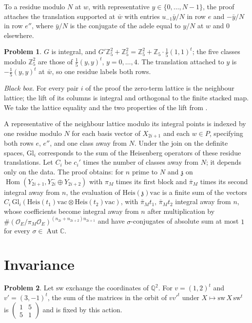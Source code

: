 \documentclass[reqno]{amsart}
\theoremstyle{definition}
\newtheorem{problem}{Problem}[section]
\theoremstyle{plain}
\newcommand{\Z}{\mathbb{Z}}
\newcommand{\Q}{\mathbb{Q}}
\newcommand{\C}{\mathbb{C}}
\newcommand{\Oc}{\mathcal{O}}
\newcommand{\Hom}{\operatorname{Hom}}
\newcommand{\Aut}{\operatorname{Aut}}
\newcommand{\Heis}{\mathrm{Heis}}
\newcommand{\vac}{\mathrm{vac}}
\newcommand{\Gl}{\mathrm{Gl}}
\newcommand{\z}{{\mathfrak{z}}}
\begin{document}
To a residue modulo \(N\) at \(w\), with representative \(y\in\{0,\dots,N-1\}\), the proof attaches the translation supported at \(\bar w\) with entries \(u_{-1}\bar y/N\) in row \(e\) and \(-\bar y/N\) in row \(e''\), where \(\bar y/N\) is the conjugate of the adele equal to \(y/N\) at \(w\) and \(0\) elsewhere.

\begin{problem}\label{pr:one-residue}
\(G\) is integral, and \(G'\Z_5^2+\Z_5^2=\Z_5^2+\Z_5\cdot\tfrac15(1,1)^t\); the five classes modulo \(\Z_5^2\) are those of \(\tfrac15(y,y)^t\), \(y=0,\dots,4\).  The translation attached to \(y\) is \(-\tfrac15(y,y)^t\) at \(\bar w\), so one residue labels both rows.
\end{problem}

\emph{Black box.}  For every pair \(i\) of the proof the zero-term lattice is the neighbour lattice; the lift of its columns is integral and orthogonal to the finite stacked map.  We take the lattice equality and the two properties of the lift from \cite{GL}.

A representative of the neighbour lattice modulo its integral points is indexed by one residue modulo \(N\) for each basis vector of \(X_{2i+1}\) and each \(w\in P\), specifying both rows \(e\), \(e''\), and one class away from \(N\).  Under the join on the definite spaces, \(\Gl_i\) corresponds to the sum of the Heisenberg operators of these residue translations.  Let \(C_i\) be \(c_i'\) times the number of classes away from \(N\); it depends only on the data.  The proof obtains: for \(n\) prime to \(N\) and \(\z\) on \(\Hom(Y_{2i+1},Y_{2i}^-\oplus Y_{2i+2})\) with \(\pi_M\) times its first block and \(\bar\pi_M\) times its second integral away from \(n\), the evaluation of \(\Heis(\z)\vac\) is a finite sum of the vectors \(C_i\,\Gl_i(\Heis(t_1)\vac\otimes\Heis(t_2)\vac)\), with \(\bar\pi_Mt_1\), \(\bar\pi_Mt_2\) integral away from \(n\), whose coefficients become integral away from \(n\) after multiplication by \(\#(\Oc_E/\pi_M\Oc_E)^{(n_{2i}+n_{2i+2})n_{2i+1}}\) and have \(\sigma\)-conjugates of absolute sum at most \(1\) for every \(\sigma\in\Aut\C\).

\section{Invariance}\label{sec:joint}

\begin{problem}\label{pr:swap}
Let \(\mathrm{sw}\) exchange the coordinates of \(\Q^2\).  For \(v=(1,2)^t\) and \(v'=(3,-1)^t\), the sum of the matrices in the orbit of \(v{v'}^t\) under \(X\mapsto\mathrm{sw}\,X\,\mathrm{sw}^t\) is \(\left(\begin{smallmatrix}1&5\\5&1\end{smallmatrix}\right)\) and is fixed by this action.
\end{problem}
\end{document}
